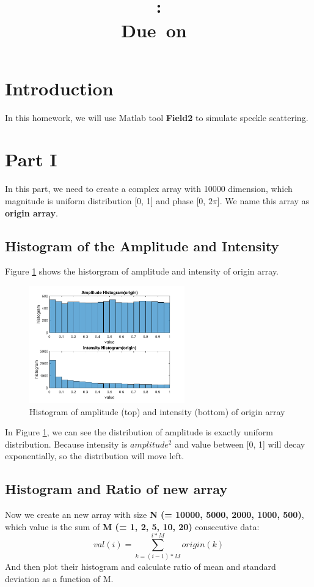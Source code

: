 \documentclass{article}
\title{
    \vspace{2in}
    \textmd{\textbf{\hmwkClass}}\\
    \textmd{\textbf{\hmwkID: \hmwkTitle}} \\
    \normalsize\vspace{0.1in}\small{Due\ on\ \hmwkDueDate}\\
    \vspace{3in}
}
\author{\textbf{\hmwkAuthorName}}
\date{} %
\begin{document}
\maketitle
\newpage

\renewcommand\thesubsection{\thesection.\alph{subsection}}

\section{Introduction}
In this homework, we will use Matlab tool \textbf{Field2} to simulate speckle scattering.

\section{Part \RN{1}}
In this part, we need to create a complex array with 10000 dimension, which magnitude is uniform distribution [0, 1] and phase [0, $2\pi$].
We name this array as \textbf{origin array}.

\subsection{Histogram of the Amplitude and Intensity}
Figure \ref{fig:hist-origin} shows the historgram of amplitude and intensity of origin array.
\begin{figure}[H]
	\centering
	\includegraphics[width = 0.6\textwidth]{src/2pi/hist_origin.pdf}
	\caption{Histogram of amplitude (top) and intensity (bottom) of origin array}
	\label{fig:hist-origin}
\end{figure}
In Figure \ref{fig:hist-origin}, we can see the distribution of amplitude is exactly uniform distribution. Because intensity is $amplitude^2$ and 
value between [0, 1] will decay exponentially, so the distribution will move left.

\subsection{Histogram and Ratio of new array}
Now we create an new array with size \textbf{N (= 10000, 5000, 2000, 1000, 500)}, which value is the sum of \textbf{M (= 1, 2, 5, 10, 20)} consecutive data:
$$
	val(i) = \sum_{k = (i-1)*M}^{i*M}{origin(k)}
$$ 
And then plot their histogram and calculate ratio of mean and standard deviation as a function of M. 
\end{document}
